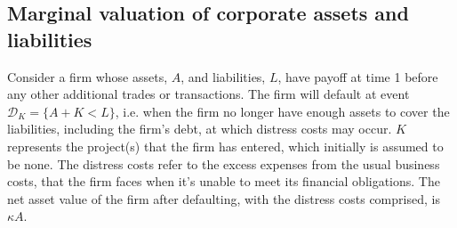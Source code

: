 \documentclass[../main.tex]{subfiles}
\begin{document}
    \subsection{Marginal valuation of corporate assets and liabilities}
        Consider a firm whose assets, $A$, and liabilities, $L$, have payoff at time 1 before any other additional trades or transactions.        
        The firm will default at event $\mathcal{D}_K=\{A + K<L\}$, i.e. when the firm no longer have enough assets to cover the liabilities, including the firm's debt, at which distress costs may occur.
        $K$ represents the project(s) that the firm has entered, which initially is assumed to be none.
        The distress costs refer to the excess expenses from the usual business costs, that the firm faces when it's unable to meet its financial obligations.
        The net asset value of the firm after defaulting, with the distress costs comprised, is $\kappa A$.
        
\end{document}
